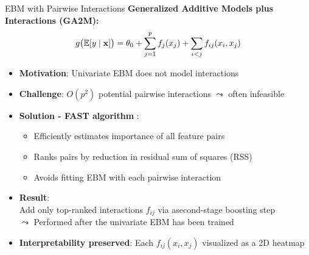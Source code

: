 \documentclass[10pt,compress,t,notes=noshow, xcolor=table]{beamer}
\begin{document}
\begin{frame}{EBM with Pairwise Interactions}
\textbf{Generalized Additive Models plus Interactions (GA2M):}
$$
g\big(\mathbb{E}[y \mid \mathbf{x}]\big) = \theta_0 + \sum_{j=1}^p f_j(x_j) + \sum_{i<j} f_{ij}(x_i, x_j)
$$

\begin{itemize}
    \item \textbf{Motivation}: Univariate EBM does not model interactions
    \item \textbf{Challenge}: $O(p^2)$ potential pairwise interactions
    $\leadsto$ often infeasible %
    \item \textbf{Solution - FAST algorithm} %
:
    \begin{itemize}
        \item Efficiently estimates importance of all feature pairs
        \item Ranks pairs by reduction in residual sum of squares (RSS)
        \item Avoids fitting EBM with each pairwise interaction
    \end{itemize}
    \item \textbf{Result}: \\Add only top-ranked interactions $f_{ij}$ via asecond-stage boosting step\\
    $\leadsto$ Performed after the univariate EBM has been trained
    \item \textbf{Interpretability preserved}: Each $f_{ij}(x_i, x_j)$ visualized as a 2D heatmap
\end{itemize}
\end{frame}



\end{document}
